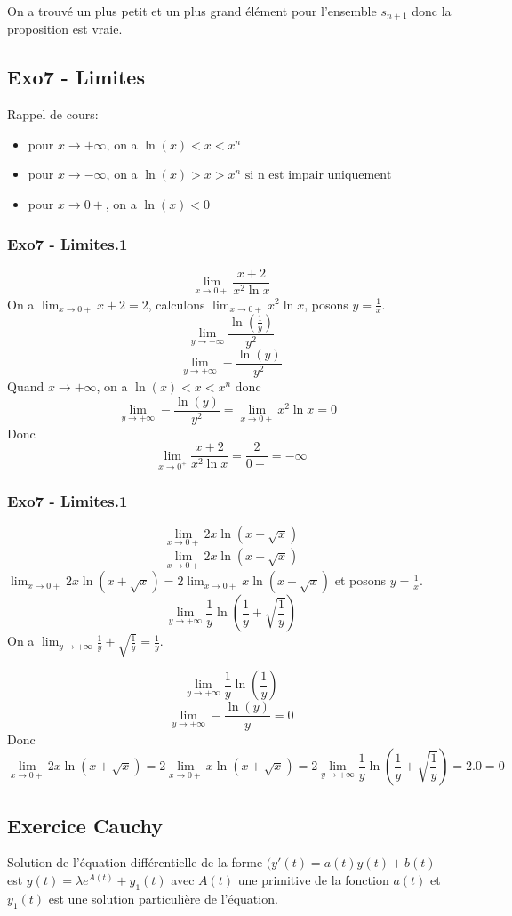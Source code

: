 \documentclass[]{book}
\theoremstyle{definition}
\begin{document}
On a trouv\'e un plus petit et un plus grand \'el\'ement pour l'ensemble $s_{n+1}$ donc la proposition est vraie.
 
\newpage
\subsection*{Exo7 - Limites}
Rappel de cours:
\begin{itemize}
\item pour $x \to +\infty$, on a $\ln(x) < x < x^n$
\item pour $x \to -\infty$, on a $\ln(x) > x > x^n \textrm{ si n est impair uniquement}$
\item pour $x \to 0+$, on a $\ln(x) < 0$
\end{itemize}

\subsubsection*{Exo7 - Limites.1}
$$\lim_{x \to 0+} \frac{x+2}{x^2\ln x}$$
On a $\lim_{x \to 0+} x+2 = 2$, calculons $\lim_{x \to 0+}x^2\ln x$, posons $y = \frac{1}{x}$.\
$$\lim_{y \to +\infty}\frac{\ln(\frac{1}{y})}{y^2}$$
$$\lim_{y \to +\infty}-\frac{\ln(y)}{y^2}$$
Quand $x \to +\infty$, on a $\ln(x) < x < x^n$ donc
$$\lim_{y \to +\infty}-\frac{\ln(y)}{y^2} = \lim_{x \to 0+}x^2\ln x = 0^{-}$$
Donc 
$$\lim_{x \to 0^{+}} \frac{x+2}{x^2\ln x} = \frac{2}{0-} = -\infty$$

\subsubsection*{Exo7 - Limites.1}
$$\lim_{x \to 0+} 2x\ln(x+\sqrt{x})$$
$$\lim_{x \to 0+} 2x\ln(x+\sqrt{x})$$
$\lim_{x \to 0+} 2x\ln(x+\sqrt{x}) = 2 \lim_{x \to 0+} x\ln(x+\sqrt{x})$ et posons $y = \frac{1}{x}$.
$$\lim_{y \to +\infty}\frac{1}{y}\ln(\frac{1}{y} + \sqrt{\frac{1}{y}})$$
On a $\lim_{y \to +\infty} \frac{1}{y} + \sqrt{\frac{1}{y}} = \frac{1}{y}$.

$$\lim_{y \to +\infty}\frac{1}{y}\ln(\frac{1}{y})$$
$$\lim_{y \to +\infty}-\frac{\ln(y)}{y} = 0$$
Donc
$$\lim_{x \to 0+} 2x\ln(x+\sqrt{x}) = 2 \lim_{x \to 0+} x\ln(x+\sqrt{x}) = 2\lim_{y \to +\infty}\frac{1}{y}\ln(\frac{1}{y} + \sqrt{\frac{1}{y}}) = 2.0 = 0$$


\newpage
\subsection*{Exercice Cauchy}
Solution de l'\'equation diff\'erentielle de la forme $(y'(t) = a(t)y(t) + b(t)$ est $y(t) = \lambda e^{A(t)}+y_1(t)$ avec $A(t)$ une primitive de la fonction $a(t)$ et $y_1(t)$ est une solution particuli\`ere de l'\'equation.\\
\end{document}
